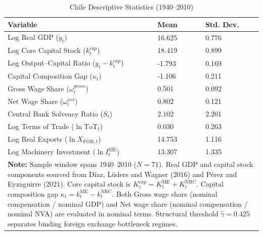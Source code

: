 \begin{table}[H]
\centering
\footnotesize
\caption{Chile Descriptive Statistics (1940--2010)}
\label{tab:cl_stylized_facts_summary}
\begin{tabular}{p{7.5cm} p{2.5cm} p{2.5cm}}
\hline\hline
\textbf{Variable} & \textbf{Mean} & \textbf{Std. Dev.} \\
\hline
Log Real GDP ($y_t$) & 16.625 & 0.776 \\
Log Core Capital Stock ($k_t^{cap}$) & 18.419 & 0.899 \\
Log Output--Capital Ratio ($y_t - k_t^{cap}$) & -1.793 & 0.169 \\
Capital Composition Gap ($\kappa_t$) & -1.106 & 0.211 \\
Gross Wage Share ($\omega_t^{gross}$) & 0.501 & 0.092 \\
Net Wage Share ($\omega_t^{net}$) & 0.802 & 0.121 \\
Central Bank Solvency Ratio ($S_t$) & 2.102 & 2.201 \\
Log Terms of Trade ($\ln \text{ToT}_t$) & 0.030 & 0.263 \\
Log Real Exports ($\ln X_{\text{FOB},t}$) & 14.753 & 1.116 \\
Log Machinery Investment ($\ln I_t^{\text{ME}}$) & 13.307 & 1.335 \\
\hline\hline
\multicolumn{3}{p{12.5cm}}{\scriptsize \textbf{Note:} Sample window spans 1940--2010 ($N = 71$). Real GDP and capital stock components sourced from Díaz, Lüders and Wagner (2016) and Pérez and Eyzaguirre (2021). Core capital stock is $K_t^{cap} = K_t^{\text{ME}} + K_t^{\text{NRC}}$. Capital composition gap $\kappa_t = k_t^{\text{ME}} - k_t^{\text{NRC}}$. Both Gross wage share (nominal compensation / nominal GDP) and Net wage share (nominal compensation / nominal NVA) are evaluated in nominal terms. Structural threshold $\hat{\gamma} = 0.425$ separates binding foreign exchange bottleneck regimes.} \\
\end{tabular}
\end{table}


